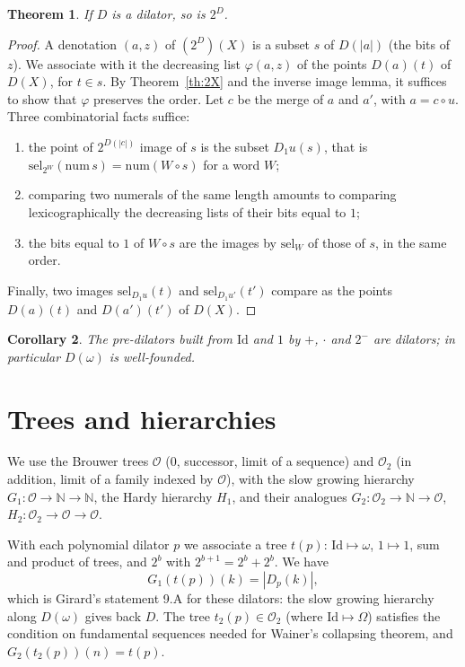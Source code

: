\documentclass[11pt,a4paper]{article}
\newtheorem{theorem}{Theorem}[section]
\newtheorem{corollary}[theorem]{Corollary}
\theoremstyle{definition}
\theoremstyle{remark}
\newcommand{\sel}{\mathrm{sel}}
\newcommand{\N}{\mathbb{N}}
\begin{document}
\begin{theorem}\label{th:2D}
If $D$ is a dilator, so is $2^D$.
\end{theorem}

\begin{proof}
A denotation $(a, z)$ of $(2^D)(X)$ is a subset $s$ of $D(|a|)$ (the bits
of $z$). We associate with it the decreasing list $\varphi(a,z)$ of the
points $D(a)(t)$ of $D(X)$, for $t \in s$. By Theorem~\ref{th:2X} and the
inverse image lemma, it suffices to show that $\varphi$ preserves the
order. Let $c$ be the merge of $a$ and $a'$, with $a = c \circ u$. Three
combinatorial facts suffice:
\begin{enumerate}
\item the point of $2^{D(|c|)}$ image of $s$ is the subset $D_1 u(s)$,
  that is $\sel_{2^W}(\mathrm{num}\,s) = \mathrm{num}(W \circ s)$ for a
  word $W$;
\item comparing two numerals of the same length amounts to comparing
  lexicographically the decreasing lists of their bits equal to $1$;
\item the bits equal to $1$ of $W \circ s$ are the images by $\sel_W$ of
  those of $s$, in the same order.
\end{enumerate}
Finally, two images $\sel_{D_1 u}(t)$ and $\sel_{D_1 u'}(t')$ compare as
the points $D(a)(t)$ and $D(a')(t')$ of $D(X)$.
\end{proof}

\begin{corollary}
The pre-dilators built from $\mathrm{Id}$ and $1$ by $+$, $\cdot$ and
$2^-$ are dilators; in particular $D(\omega)$ is well-founded.
\end{corollary}

\section{Trees and hierarchies}

We use the Brouwer trees $\mathcal O$ ($0$, successor, limit of a
sequence) and $\mathcal O_2$ (in addition, limit of a family indexed by
$\mathcal O$), with the slow growing hierarchy $G_1 : \mathcal O \to \N
\to \N$, the Hardy hierarchy $H_1$, and their analogues $G_2 : \mathcal
O_2 \to \N \to \mathcal O$, $H_2 : \mathcal O_2 \to \mathcal O \to
\mathcal O$.

With each polynomial dilator $p$ we associate a tree $t(p)$:
$\mathrm{Id} \mapsto \omega$, $1 \mapsto 1$, sum and product of trees, and
$2^b$ with $2^{b+1} = 2^b + 2^b$. We have
\[
G_1(t(p))(k) = |D_p(k)|,
\]
which is Girard's statement 9.A for these dilators: the slow growing
hierarchy along $D(\omega)$ gives back $D$. The tree $t_2(p) \in \mathcal
O_2$ (where $\mathrm{Id} \mapsto \Omega$) satisfies the condition on
fundamental sequences needed for Wainer's collapsing theorem, and
$G_2(t_2(p))(n) = t(p)$.
\end{document}
